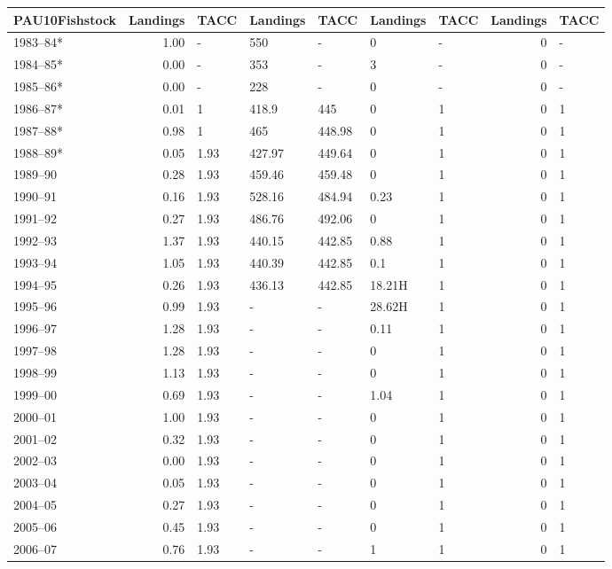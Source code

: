 \documentclass{mpi-plenary}
\theoremstyle{definition}
\theoremstyle{definition}
\theoremstyle{definition}
\theoremstyle{remark}
\begin{document}
\begin{tabular}{l|r|l|l|l|l|l|r|l}
\hline
PAU10Fishstock & Landings & TACC & Landings & TACC & Landings & TACC & Landings & TACC\\
\hline
1983–84* & 1.00 & - & 550 & - & 0 & - & 0 & -\\
\hline
1984–85* & 0.00 & - & 353 & - & 3 & - & 0 & -\\
\hline
1985–86* & 0.00 & - & 228 & - & 0 & - & 0 & -\\
\hline
1986–87* & 0.01 & 1 & 418.9 & 445 & 0 & 1 & 0 & 1\\
\hline
1987–88* & 0.98 & 1 & 465 & 448.98 & 0 & 1 & 0 & 1\\
\hline
1988–89* & 0.05 & 1.93 & 427.97 & 449.64 & 0 & 1 & 0 & 1\\
\hline
1989–90 & 0.28 & 1.93 & 459.46 & 459.48 & 0 & 1 & 0 & 1\\
\hline
1990–91 & 0.16 & 1.93 & 528.16 & 484.94 & 0.23 & 1 & 0 & 1\\
\hline
1991–92 & 0.27 & 1.93 & 486.76 & 492.06 & 0 & 1 & 0 & 1\\
\hline
1992–93 & 1.37 & 1.93 & 440.15 & 442.85 & 0.88 & 1 & 0 & 1\\
\hline
1993–94 & 1.05 & 1.93 & 440.39 & 442.85 & 0.1 & 1 & 0 & 1\\
\hline
1994–95 & 0.26 & 1.93 & 436.13 & 442.85 & 18.21H & 1 & 0 & 1\\
\hline
1995–96 & 0.99 & 1.93 & - & - & 28.62H & 1 & 0 & 1\\
\hline
1996–97 & 1.28 & 1.93 & - & - & 0.11 & 1 & 0 & 1\\
\hline
1997–98 & 1.28 & 1.93 & - & - & 0 & 1 & 0 & 1\\
\hline
1998–99 & 1.13 & 1.93 & - & - & 0 & 1 & 0 & 1\\
\hline
1999–00 & 0.69 & 1.93 & - & - & 1.04 & 1 & 0 & 1\\
\hline
2000–01 & 1.00 & 1.93 & - & - & 0 & 1 & 0 & 1\\
\hline
2001–02 & 0.32 & 1.93 & - & - & 0 & 1 & 0 & 1\\
\hline
2002–03 & 0.00 & 1.93 & - & - & 0 & 1 & 0 & 1\\
\hline
2003–04 & 0.05 & 1.93 & - & - & 0 & 1 & 0 & 1\\
\hline
2004–05 & 0.27 & 1.93 & - & - & 0 & 1 & 0 & 1\\
\hline
2005–06 & 0.45 & 1.93 & - & - & 0 & 1 & 0 & 1\\
\hline
2006–07 & 0.76 & 1.93 & - & - & 1 & 1 & 0 & 1\\
\hline

\end{tabular}
\end{document}
